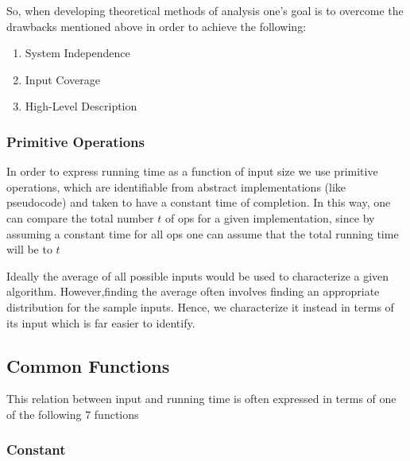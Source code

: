 \par{So, when developing theoretical methods of analysis one's goal is to overcome the drawbacks mentioned above in order to achieve the following:}

\begin{enumerate}
	\item System Independence
	\item Input Coverage
	\item High-Level Description
\end{enumerate}

\subsubsection{Primitive Operations}


\par{In order to express running time as a function of input size we use primitive operations, which are identifiable from abstract implementations (like
pseudocode) and taken to have a constant time of completion. In this way, one can compare the total number $t$ of ops for a given implementation, since by
assuming a constant time for all ops one can assume that the total running time will be  to $t$} 

\par{Ideally the average of all possible inputs would be used to characterize a given algorithm. However,finding the average often involves finding an
		appropriate distribution for the sample inputs. Hence, we characterize it instead in terms of its  input which is far easier to
		identify. }

\subsection{Common Functions}

\par{This relation between input and running time is often expressed in terms of one of the following 7 functions}

\subsubsection{Constant}

